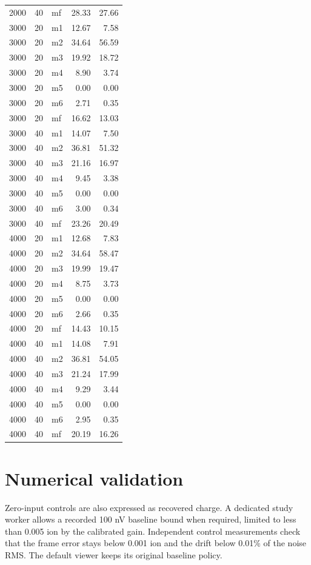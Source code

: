 \documentclass[10pt,a4paper]{article}
\begin{document}
\begin{center}
\begin{longtable}{rrlrr}
2000 & 40 & mf & 28.33 & 27.66 \\
3000 & 20 & m1 & 12.67 & 7.58 \\
3000 & 20 & m2 & 34.64 & 56.59 \\
3000 & 20 & m3 & 19.92 & 18.72 \\
3000 & 20 & m4 & 8.90 & 3.74 \\
3000 & 20 & m5 & 0.00 & 0.00 \\
3000 & 20 & m6 & 2.71 & 0.35 \\
3000 & 20 & mf & 16.62 & 13.03 \\
3000 & 40 & m1 & 14.07 & 7.50 \\
3000 & 40 & m2 & 36.81 & 51.32 \\
3000 & 40 & m3 & 21.16 & 16.97 \\
3000 & 40 & m4 & 9.45 & 3.38 \\
3000 & 40 & m5 & 0.00 & 0.00 \\
3000 & 40 & m6 & 3.00 & 0.34 \\
3000 & 40 & mf & 23.26 & 20.49 \\
4000 & 20 & m1 & 12.68 & 7.83 \\
4000 & 20 & m2 & 34.64 & 58.47 \\
4000 & 20 & m3 & 19.99 & 19.47 \\
4000 & 20 & m4 & 8.75 & 3.73 \\
4000 & 20 & m5 & 0.00 & 0.00 \\
4000 & 20 & m6 & 2.66 & 0.35 \\
4000 & 20 & mf & 14.43 & 10.15 \\
4000 & 40 & m1 & 14.08 & 7.91 \\
4000 & 40 & m2 & 36.81 & 54.05 \\
4000 & 40 & m3 & 21.24 & 17.99 \\
4000 & 40 & m4 & 9.29 & 3.44 \\
4000 & 40 & m5 & 0.00 & 0.00 \\
4000 & 40 & m6 & 2.95 & 0.35 \\
4000 & 40 & mf & 20.19 & 16.26 \\
\bottomrule\end{longtable}\end{center}

\section{Numerical validation}
Zero-input controls are also expressed as recovered charge. A dedicated study
worker allows a recorded 100 nV baseline bound when required, limited to less
than 0.005 ion by the calibrated gain. Independent control measurements check
that the frame error stays below 0.001 ion and the drift below 0.01\% of the
noise RMS. The default viewer keeps its original baseline policy.
\end{document}
